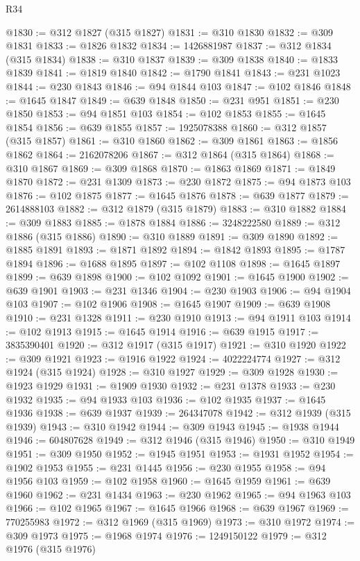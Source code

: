 \begin{lexlean}{R34}
\begin{coremodule}
@1830 := @312 @1827 (@315 @1827)
@1831 := @310 @1830
@1832 := @309 @1831
@1833 := @1826 @1832
@1834 := 1426881987
@1837 := @312 @1834 (@315 @1834)
@1838 := @310 @1837
@1839 := @309 @1838
@1840 := @1833 @1839
@1841 := @1819 @1840
@1842 := @1790 @1841
@1843 := @231 @1023
@1844 := @230 @1843
@1846 := @94 @1844 @103
@1847 := @102 @1846
@1848 := @1645 @1847
@1849 := @639 @1848
@1850 := @231 @951
@1851 := @230 @1850
@1853 := @94 @1851 @103
@1854 := @102 @1853
@1855 := @1645 @1854
@1856 := @639 @1855
@1857 := 1925078388
@1860 := @312 @1857 (@315 @1857)
@1861 := @310 @1860
@1862 := @309 @1861
@1863 := @1856 @1862
@1864 := 2162078206
@1867 := @312 @1864 (@315 @1864)
@1868 := @310 @1867
@1869 := @309 @1868
@1870 := @1863 @1869
@1871 := @1849 @1870
@1872 := @231 @1309
@1873 := @230 @1872
@1875 := @94 @1873 @103
@1876 := @102 @1875
@1877 := @1645 @1876
@1878 := @639 @1877
@1879 := 2614888103
@1882 := @312 @1879 (@315 @1879)
@1883 := @310 @1882
@1884 := @309 @1883
@1885 := @1878 @1884
@1886 := 3248222580
@1889 := @312 @1886 (@315 @1886)
@1890 := @310 @1889
@1891 := @309 @1890
@1892 := @1885 @1891
@1893 := @1871 @1892
@1894 := @1842 @1893
@1895 := @1787 @1894
@1896 := @1688 @1895
@1897 := @102 @1108
@1898 := @1645 @1897
@1899 := @639 @1898
@1900 := @102 @1092
@1901 := @1645 @1900
@1902 := @639 @1901
@1903 := @231 @1346
@1904 := @230 @1903
@1906 := @94 @1904 @103
@1907 := @102 @1906
@1908 := @1645 @1907
@1909 := @639 @1908
@1910 := @231 @1328
@1911 := @230 @1910
@1913 := @94 @1911 @103
@1914 := @102 @1913
@1915 := @1645 @1914
@1916 := @639 @1915
@1917 := 3835390401
@1920 := @312 @1917 (@315 @1917)
@1921 := @310 @1920
@1922 := @309 @1921
@1923 := @1916 @1922
@1924 := 4022224774
@1927 := @312 @1924 (@315 @1924)
@1928 := @310 @1927
@1929 := @309 @1928
@1930 := @1923 @1929
@1931 := @1909 @1930
@1932 := @231 @1378
@1933 := @230 @1932
@1935 := @94 @1933 @103
@1936 := @102 @1935
@1937 := @1645 @1936
@1938 := @639 @1937
@1939 := 264347078
@1942 := @312 @1939 (@315 @1939)
@1943 := @310 @1942
@1944 := @309 @1943
@1945 := @1938 @1944
@1946 := 604807628
@1949 := @312 @1946 (@315 @1946)
@1950 := @310 @1949
@1951 := @309 @1950
@1952 := @1945 @1951
@1953 := @1931 @1952
@1954 := @1902 @1953
@1955 := @231 @1445
@1956 := @230 @1955
@1958 := @94 @1956 @103
@1959 := @102 @1958
@1960 := @1645 @1959
@1961 := @639 @1960
@1962 := @231 @1434
@1963 := @230 @1962
@1965 := @94 @1963 @103
@1966 := @102 @1965
@1967 := @1645 @1966
@1968 := @639 @1967
@1969 := 770255983
@1972 := @312 @1969 (@315 @1969)
@1973 := @310 @1972
@1974 := @309 @1973
@1975 := @1968 @1974
@1976 := 1249150122
@1979 := @312 @1976 (@315 @1976)

\end{coremodule}
\end{lexlean}
